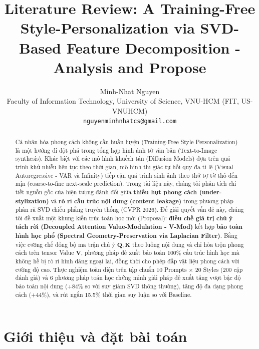 \documentclass[10pt,twocolumn,letterpaper]{article}
\title{Literature Review: A Training-Free Style-Personalization via SVD-Based Feature Decomposition - Analysis and Propose}
\author{Minh-Nhat Nguyen\\
Faculty of Information Technology, University of Science, VNU-HCM (FIT, US-VNUHCM)\\
{\tt\small nguyenminhnhatcs@gmail.com}
}
\begin{document}
\maketitle

\begin{abstract}
Cá nhân hóa phong cách không cần huấn luyện (Training-Free Style Personalization) là một hướng đi đột phá trong tổng hợp hình ảnh từ văn bản (Text-to-Image synthesis). Khác biệt với các mô hình khuếch tán (Diffusion Models) dựa trên quá trình khử nhiễu liên tục theo thời gian, mô hình thị giác tự hồi quy đa tỉ lệ (Visual Autoregressive - VAR và Infinity) tiếp cận quá trình sinh ảnh theo thứ tự từ thô đến mịn (coarse-to-fine next-scale prediction). Trong tài liệu này, chúng tôi phân tích chi tiết nguồn gốc của hiện tượng đánh đổi giữa \textbf{thiếu hụt phong cách (under-stylization)} và \textbf{rò rỉ cấu trúc nội dung (content leakage)} trong phương pháp phân rã SVD chiếu phẳng truyền thống (CVPR 2026). Để giải quyết vấn đề này, chúng tôi đề xuất một khung kiến trúc toán học mới (Proposal): \textbf{điều chế giá trị chú ý tách rời (Decoupled Attention Value-Modulation - V-Mod)} kết hợp \textbf{bảo toàn hình học phổ (Spectral Geometry-Preservation via Laplacian Filter)}. Bằng việc cưỡng chế đồng bộ ma trận chú ý $\mathbf{Q},\mathbf{K}$ theo luồng nội dung và chỉ hòa trộn phong cách trên tensor Value $\mathbf{V}$, phương pháp đề xuất bảo toàn $100\%$ cấu trúc hình học mà không hề bị rò rỉ hình dáng ngoại lai, đồng thời cho phép đắp vật liệu phong cách với cường độ cao. Thực nghiệm toàn diện trên tập chuẩn 10 Prompts $\times$ 20 Styles (200 cặp đánh giá) và 6 phương pháp toán học chứng minh giải pháp đề xuất tăng vượt bậc độ bảo toàn nội dung (+84\% so với suy giảm SVD thông thường), tăng độ đa dạng phong cách (+44\%), và rút ngắn 15.5\% thời gian suy luận so với Baseline.
\end{abstract}

\section{Giới thiệu và đặt bài toán}
\label{sec:intro}
\end{document}
